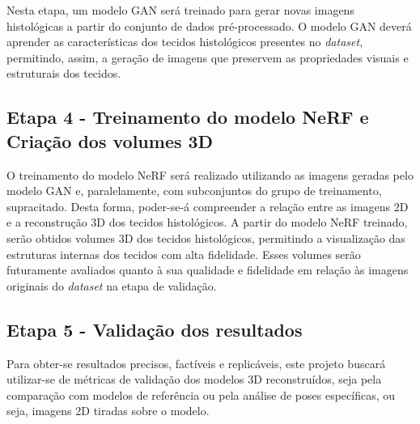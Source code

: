 Nesta etapa, um modelo GAN será treinado para gerar novas imagens histológicas a partir do conjunto de dados pré-processado. O modelo GAN deverá aprender as características dos tecidos histológicos presentes no \textit{dataset}, permitindo, assim, a geração de imagens que preservem as propriedades visuais e estruturais dos tecidos. 


\subsection{Etapa 4 - Treinamento do modelo NeRF e Criação dos volumes 3D}

O treinamento do modelo NeRF será realizado utilizando as imagens geradas pelo modelo GAN e, paralelamente, com subconjuntos do grupo de treinamento, supracitado. Desta forma, poder-se-á compreender a relação entre as imagens 2D e a reconstrução 3D dos tecidos histológicos. %
A partir do modelo NeRF treinado, serão obtidos volumes 3D dos tecidos histológicos, permitindo a visualização das estruturas internas dos tecidos com alta fidelidade. Esses volumes serão futuramente avaliados quanto à sua qualidade e fidelidade em relação às imagens originais do \textit{dataset} na etapa de validação. 

\subsection{Etapa 5 - Validação dos resultados}

Para obter-se resultados precisos, factíveis e replicáveis, este projeto buscará utilizar-se de métricas de validação dos modelos 3D reconstruídos, seja pela comparação com modelos de referência ou pela análise de poses específicas, ou seja, imagens 2D tiradas sobre o modelo.

